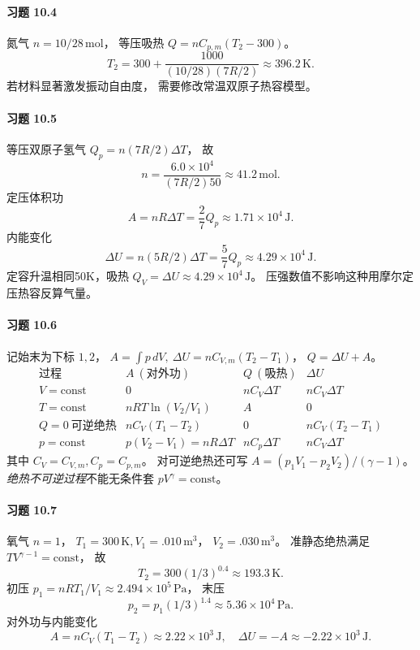 \paragraph{习题 10.4}
氮气 \(n=10/28\,\mathrm{mol}\)，
等压吸热
\(Q=nC_{p,m}(T_2-300)\)。
\[
 \boxed{T_2=300+\frac{1000}
 {(10/28)(7R/2)}
 \approx396.2\,\mathrm K}.
\]
若材料显著激发振动自由度，
需要修改常温双原子热容模型。

\paragraph{习题 10.5}
等压双原子氢气
\(Q_p=n(7R/2)\Delta T\)，
故
\[
 \boxed{n=\frac{6.0\times10^4}{(7R/2)50}
 \approx41.2\,\mathrm{mol}}.
\]
定压体积功
\[
 \boxed{A=nR\Delta T=\frac27Q_p
 \approx1.71\times10^4\,\mathrm J}.
\]
内能变化
\[
 \boxed{\Delta U=n(5R/2)\Delta T
 =\frac57Q_p\approx4.29\times10^4\,\mathrm J}.
\]
定容升温相同50K，吸热
\(\boxed{Q_V=\Delta U\approx4.29\times10^4\,\mathrm J}\)。
压强数值不影响这种用摩尔定压热容反算气量。

\paragraph{习题 10.6}
记始末为下标 \(1,2\)，
\(A=\int p\,dV,\ \Delta U=nC_{V,m}(T_2-T_1)\)，
\(Q=\Delta U+A\)。
\[
\begin{array}{c|c|c|c}
\text{过程}&A\ (\text{对外功})&Q\ (\text{吸热})&
\Delta U\\\hline
V=\mathrm{const}&0&nC_V\Delta T&nC_V\Delta T\\
T=\mathrm{const}&nRT\ln(V_2/V_1)&A&0\\
Q=0\ \text{可逆绝热}&nC_V(T_1-T_2)&0&
nC_V(T_2-T_1)\\
p=\mathrm{const}&p(V_2-V_1)=nR\Delta T&
nC_p\Delta T&nC_V\Delta T
\end{array}
\]
其中 \(C_V=C_{V,m},C_p=C_{p,m}\)。
对可逆绝热还可写
\(A=(p_1V_1-p_2V_2)/(\gamma-1)\)。
\emph{绝热不可逆过程}不能无条件套
\(pV^\gamma=\mathrm{const}\)。

\paragraph{习题 10.7}
氧气 \(n=1\)，
\(T_1=300\,\mathrm K,V_1=.010\,\mathrm{m^3}\)，
\(V_2=.030\,\mathrm{m^3}\)。
准静态绝热满足
\(TV^{\gamma-1}=\mathrm{const}\)，
故
\[
 \boxed{T_2=300(1/3)^{0.4}
 \approx193.3\,\mathrm K}.
\]
初压
\(p_1=nRT_1/V_1\approx2.494\times10^5\,\mathrm{Pa}\)，
末压
\[
 \boxed{p_2=p_1(1/3)^{1.4}
 \approx5.36\times10^4\,\mathrm{Pa}}.
\]
对外功与内能变化
\[
 \boxed{A=nC_V(T_1-T_2)
 \approx2.22\times10^3\,\mathrm J},\quad
 \boxed{\Delta U=-A\approx-2.22\times10^3\,\mathrm J}.
\]

